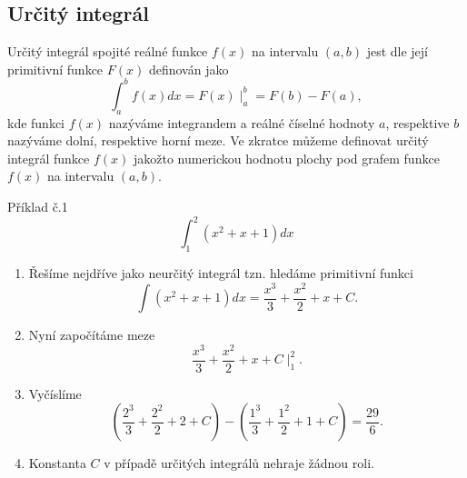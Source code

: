 \subsection{Určitý integrál}
Určitý integrál spojité reálné funkce $f(x)$ na intervalu $(a,b)$ jest dle její primitivní funkce $F(x)$ definován jako
$$
\int_a^bf(x)dx = F(x)\mid_a^b = F(b) - F(a),
$$
kde funkci $f(x)$ nazýváme integrandem a reálné číselné hodnoty $a$, respektive $b$ nazýváme dolní, respektive horní meze. Ve zkratce můžeme definovat určitý integrál funkce $f(x)$ jakožto numerickou hodnotu plochy pod grafem funkce $f(x)$ na intervalu $(a,b)$.

Příklad č.1
$$
\int_1^{2} (x^2+x+1)dx
$$
\begin{enumerate}
    \item Řešíme nejdříve jako neurčitý integrál tzn. hledáme primitivní funkci
    $$
    \int (x^2+x+1)dx = \frac{x^3}{3} + \frac{x^2}{2} + x + C.
    $$
    \item Nyní započítáme meze 
    $$
     \frac{x^3}{3} + \frac{x^2}{2} + x + C\mid_1^2.
    $$
    \item Vyčíslíme
    $$
    \left(\frac{2^3}{3}+\frac{2^2}{2}+2+C\right) - \left(\frac{1^3}{3}+\frac{1^2}{2}+1+C\right) = \frac{29}{6}.
    $$
    \item Konstanta $C$ v případě určitých integrálů nehraje žádnou roli.
\end{enumerate}
